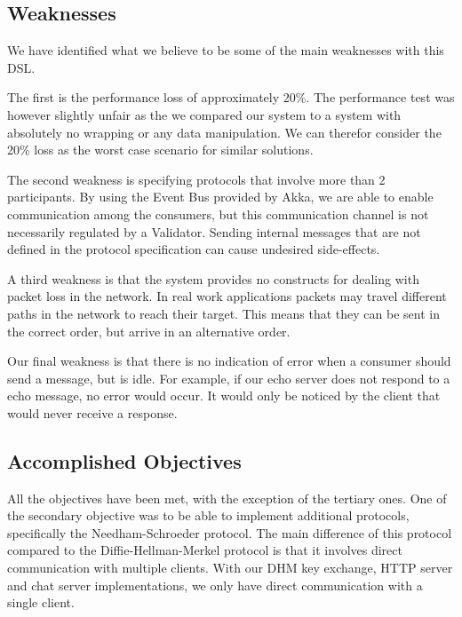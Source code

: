 \subsection{Weaknesses}
We have identified what we believe to be some of the main weaknesses with this DSL.

The first is the performance loss of approximately 20\%. The performance test was however slightly unfair as the we compared our system to a system with absolutely no wrapping or any data manipulation. We can therefor consider the 20\% loss as the worst case scenario for similar solutions.

The second weakness is specifying protocols that involve more than 2 participants. By using the Event Bus provided by Akka, we are able to enable communication among the consumers, but this communication channel is not necessarily regulated by a Validator. Sending internal messages that are not defined in the protocol specification can cause undesired side-effects. 

A third weakness is that the system provides no constructs for dealing with packet loss in the network. In real work applications packets may travel different paths in the network to reach their target. This means that they can be sent in the correct order, but arrive in an alternative order.

Our final weakness is that there is no indication of error when a consumer should send a message, but is idle. For example, if our echo server does not respond to a echo message, no error would occur. It would only be noticed by the client that would never receive a response. 



\subsection{Accomplished Objectives}
All the objectives have been met, with the exception of the tertiary ones. One of the secondary objective was to be able to implement additional protocols, specifically the Needham-Schroeder protocol. The main difference of this protocol compared to the Diffie-Hellman-Merkel protocol is that it involves direct communication with multiple clients. With our DHM key exchange, HTTP server and chat server implementations, we only have direct communication with a single client.

